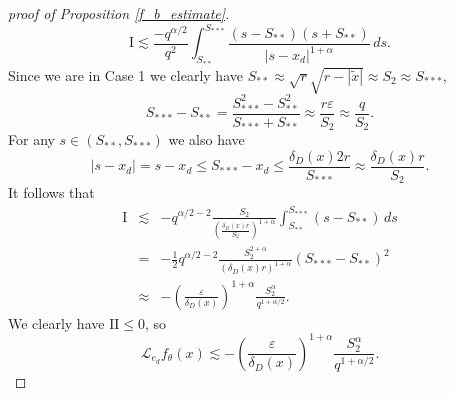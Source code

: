\documentclass[a4paper,12pt,reqno]{amsart}
\theoremstyle{definition}
\theoremstyle{remark}
\newcommand{\eps}{\varepsilon}
\newcommand{\calL}{\mathcal{L}}
\begin{document}
\begin{proof}[proof of Proposition \ref{f_b_estimate}]
\begin{equation}
\text{I} \lesssim \frac{-q^{\alpha/2} }{q^2} \int_{S_{**}}^{S_{***}} \frac{(s - S_{**})(s + S_{**})}{|s - x_d|^{1+\alpha}} \, ds.
\end{equation}
Since we are in Case 1 we clearly have $S_{**} \approx \sqrt{r} \sqrt{r - |\tilde{x}|}\approx S_{2}\approx S_{***}$,
$$
S_{***} - S_{**} = 
\frac{S^2_{***} - S^2_{**}}{S_{***} + S_{**}} 
\approx \frac{r \eps}{S_{2}}\approx \frac{q}{S_{2}}.
$$
For any $s \in (S_{**}, S_{***})$ we also have
$$
|s - x_d| = s - x_d \le S_{***} - x_d \le  \frac{\delta_D(x) 2{r}}{S_{***}}\approx \frac{\delta_D(x) {r}}{S_{2}}.
$$
It follows that 
\begin{eqnarray*}
\text{I} &\lesssim& 
{-q^{\alpha/2-2} } 
\frac{ S_{2}}{\left(\frac{\delta_D(x) r}{ S_{2}}\right)^{1 + \alpha}} 
\int_{S_{**}}^{S_{***}} (s - S_{**}) \, ds\\
&=& {-\frac12 q^{\alpha/2-2} } 
\frac{ S_{2}^{2 + \alpha}}{\left(\delta_D(x) r\right)^{1 + \alpha}}(S_{***} - S_{**})^2 \\
&\approx&
- \left (\frac\eps { \delta_D(x)}\right)^{1+\alpha} \frac{  S_{2}^{ \alpha}}{q^{1+\alpha/2}} .
\end{eqnarray*}
We clearly have $\text{II} \le 0$, so
\begin{equation}
\label{Case_1_I_III}
\calL_{e_d} f_{\theta}(x) \lesssim - \left (\frac\eps { \delta_D(x)}\right)^{1+\alpha} \frac{  S_{2}^{ \alpha}}{q^{1+\alpha/2}}.
\end{equation}

\vskip 2pt


\end{proof}
\end{document}
